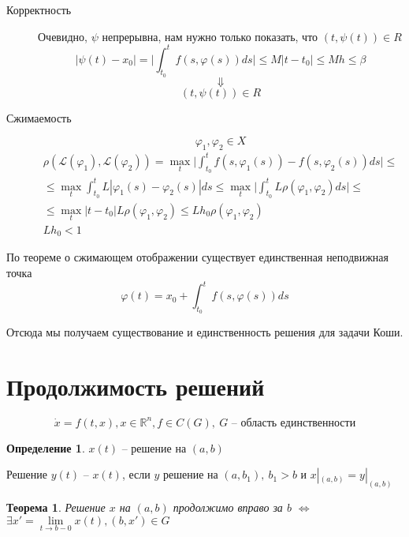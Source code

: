 \documentclass[a4paper]{article}
\theoremstyle{indented}
\newtheorem*{theorem}{Теорема}
\theoremstyle{definition}
\newtheorem*{defn}{Определение}
\theoremstyle{remark}
\begin{document}
\begin{description}
\item[Корректность]
  Очевидно, $\psi$ непрерывна, нам нужно только показать, что $(t,\psi(t)) \in R$
  \[|\psi(t) - x_0| = \bigg|\int_{t_0}^{t}f(s,\varphi(s))ds \bigg| \leqslant M|t -t_0| \leqslant Mh \leqslant \beta\]
  \[\Downarrow \]
  \[(t,\psi(t)) \in R\]
\item[Сжимаемость]
  \[\varphi_1, \varphi_2 \in X\]
  \begin{equation*}
    \begin{gathered}
      \rho(\mathcal{L}(\varphi_1),\mathcal{L}(\varphi_2)) = \max\limits_t \bigg| \int_{t_0}^{t}f(s,\varphi_1(s)) - f(s,\varphi_2(s))ds \bigg| \leqslant  \\
      \leqslant \max\limits_t \int_{t_0}^{t}L |\varphi_1(s) - \varphi_2(s)| ds \leqslant \max\limits_t \bigg|\int_{t_0}^{t}L\rho(\varphi_1,\varphi_2)ds \bigg|\leqslant \\
      \leqslant \max\limits_t |t-t_0| L \rho(\varphi_1,\varphi_2) \leqslant Lh_0 \rho(\varphi_1,\varphi_2)\\
      Lh_0 < 1
    \end{gathered}
  \end{equation*}
\end{description}

По теореме о сжимающем отображении существует единственная неподвижная точка
\[\varphi(t) = x_0 + \int_{t_0}^{t}f(s,\varphi(s))ds\]

Отсюда мы получаем существование и единственность решения для задачи Коши.

\section{Продолжимость решений}

\[\dot x = f(t,x), x \in \mathbb{R}^n, f \in C(G), \ G \text{ -- область единственности}\]

\begin{defn}
  $x(t)$ -- решение на $(a,b)$

  Решение $y(t)$ --  $x(t)$, если $y$ решение на $(a,b_1), \ b_1 > b$ и $x|_{(a,b)} = y|_{(a,b)}$ 
\end{defn}

\begin{theorem}
  Решение $x$ на $(a,b)$ продолжимо вправо за $b$ $\Longleftrightarrow$ $\exists x' = \lim\limits_{t \to b-0}x(t), (b,x') \in G$
\end{theorem}
\end{document}

